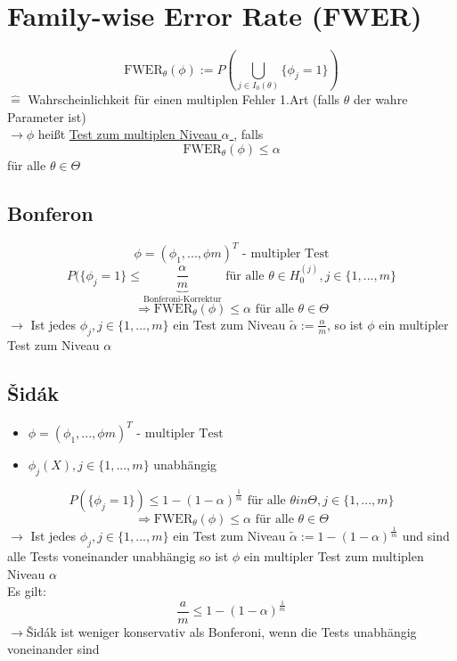 

\section{Family-wise Error Rate (FWER) }
\[ \text{FWER}_{\theta}(\phi)  := P \left( \bigcup_{j\in I_{0}(\theta)} \{ \phi_j = 1\} \right) \]
$\mathrel{\widehat{=}}$ Wahrscheinlichkeit für einen multiplen Fehler 1.Art (falls $\theta$ der wahre Parameter ist) \\
$\rightarrow \phi$ heißt \underline{Test zum multiplen Niveau $\alpha$ }, falls
\[ \text{FWER}_{\theta}(\phi) \leq \alpha \]
für alle $\theta \in \Theta $

\subsection{Bonferon}
\[ \phi = (\phi_{1},...,\phi{m})^T \text{  - multipler Test} \]
\[ P(\{\phi_j = 1\} \leq \underbrace{\frac{\alpha}{m}}_{\text{Bonferoni-Korrektur}} \text{ für alle } \theta \in H_0^{(j)}, j \in \{1,...,m\} \]
\[ \Rightarrow \text{FWER}_{\theta}(\phi) \leq \alpha \text{ für alle }\theta \in \Theta \]
$\rightarrow$ Ist jedes $\phi_j, j \in \{1,...,m\}$ ein Test zum Niveau $\tilde{\alpha} := \frac{\alpha}{m}$, so ist $\phi$ ein multipler Test zum Niveau $\alpha$

\subsection{\v Sid\'ak}
\begin{itemize}
 \item $ \phi = (\phi_{1},...,\phi{m})^T \text{  - multipler Test} $
 \item $\phi_j (X), j \in \{1,...,m \}$ unabhängig
\end{itemize}
\[ P(\{\phi_j = 1\} ) \leq 1-(1-\alpha)^{\frac{1}{m}} \text{ für alle } \theta in \Theta, j \in \{1,...,m\}\]
\[ \Rightarrow \text{FWER}_{\theta}(\phi) \leq \alpha \text{ für alle }\theta \in \Theta \]
$\rightarrow$ Ist jedes $\phi_j, j \in \{1,...,m\}$ ein Test zum Niveau $\tilde{\alpha} := 1-(1-\alpha)^{\frac{1}{m}}$ und sind alle Tests voneinander unabhängig so ist $\phi$ ein multipler Test zum multiplen Niveau $\alpha$ \\
Es gilt:
\[ \frac{a}{m} \leq 1-(1-\alpha)^{\frac{1}{m}} \]
$\rightarrow$\v Sid\'ak ist weniger konservativ als Bonferoni, wenn die Tests unabhängig voneinander sind \\

